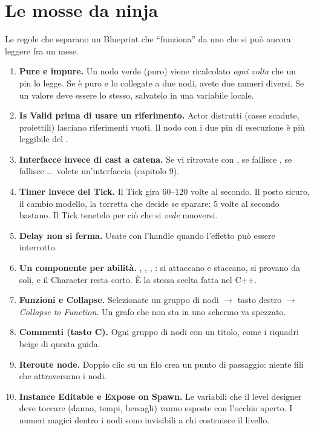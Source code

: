 \section{Le mosse da ninja}

Le regole che separano un Blueprint che ``funziona'' da uno che si può ancora leggere fra un mese.

\begin{enumerate}
  \item \textbf{Pure e impure.} Un nodo verde (puro) viene ricalcolato \emph{ogni volta} che un pin lo legge. Se  è puro e lo collegate a due nodi, avete due numeri diversi. Se un valore deve essere lo stesso, salvatelo in una variabile locale.
  \item \textbf{Is Valid prima di usare un riferimento.} Actor distrutti (casse scadute, proiettili) lasciano riferimenti vuoti. Il nodo  con i due pin di esecuzione è più leggibile del .
  \item \textbf{Interfacce invece di cast a catena.} Se vi ritrovate con , se fallisce , se fallisce \dots\ volete un'interfaccia (capitolo 9).
  \item \textbf{Timer invece del Tick.} Il Tick gira 60--120 volte al secondo. Il posto sicuro, il cambio modello, la torretta che decide se sparare: 5 volte al secondo bastano. Il Tick tenetelo per ciò che si \emph{vede} muoversi.
  \item \textbf{Delay non si ferma.} Usate  con l'handle quando l'effetto può essere interrotto.
  \item \textbf{Un componente per abilità.} , , , : si attaccano e staccano, si provano da soli, e il Character resta corto. È la stessa scelta fatta nel C++.
  \item \textbf{Funzioni e Collapse.} Selezionate un gruppo di nodi $\rightarrow$ tasto destro $\rightarrow$ \emph{Collapse to Function}. Un grafo che non sta in uno schermo va spezzato.
  \item \textbf{Commenti (tasto C).} Ogni gruppo di nodi con un titolo, come i riquadri beige di questa guida.
  \item \textbf{Reroute node.} Doppio clic su un filo crea un punto di passaggio: niente fili che attraversano i nodi.
  \item \textbf{Instance Editable e Expose on Spawn.} Le variabili che il level designer deve toccare (danno, tempi, bersagli) vanno esposte con l'occhio aperto. I numeri magici dentro i nodi sono invisibili a chi costruisce il livello.
\end{enumerate}

